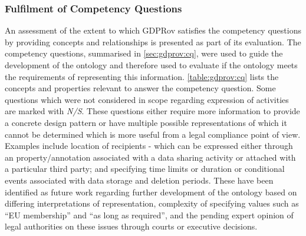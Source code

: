 \subsubsection{Fulfilment of Competency Questions}
An assessment of the extent to which GDPRov satisfies the competency questions by providing concepts and relationships is presented as part of its evaluation.
The competency questions, summarised in \autoref{sec:gdprov:cq}, were used to guide the development of the ontology and therefore used to evaluate if the ontology meets the requirements of representing this information.
\autoref{table:gdprov:cq} lists the concepts and properties relevant to answer the competency question. Some questions which were not considered in scope regarding expression of activities are marked with \textit{N/S}. These questions either require more information to provide a concrete design pattern or have multiple possible representations of which it cannot be determined which is more useful from a legal compliance point of view. Examples include location of recipients - which can be expressed either through an property/annotation associated with a data sharing activity or attached with a particular third party; and specifying time limits or duration or conditional events associated with data storage and deletion periods. These have been identified as future work regarding further development of the ontology based on differing interpretations of representation, complexity of specifying values such as ``EU membership'' and  ``as long as required'', and the pending expert opinion of legal authorities on these issues through courts or executive decisions.
